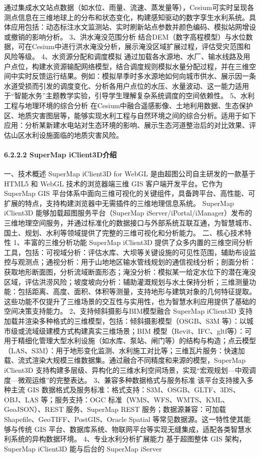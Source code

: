 通过集成水文站点数据（如水位、雨量、流速、蒸发量等），Cesium可实时呈现各测点信息在三维地球上的分布和状态变化，构建感知驱动的数字孪生水利系统。具体应用包括：动态标注水文监测站、实时刷新站点参数并颜色编码、模拟站网增设或撤销的影响分析。 3、洪水淹没范围分析 结合DEM（数字高程模型）与水位数据，可在Cesium中进行洪水淹没分析，展示淹没区域扩展过程，评估受灾范围和风险等级。 4、水资源分配和调度模拟 通过加载各水源地、水厂、输水线路及用户点位，构建水资源输配网络模型，结合调度规则模拟水量分配过程，并在三维空间中实时反馈运行结果。例如：模拟旱季时多水源地如何向城市供水、展示因一条水道受损而引发的调度变化、分析各用户点位的水压、水量波动、这一能力适用于``智能水务''主题教学实验，引导学生理解复杂系统调度的空间依赖性。 5、水利工程与地理环境的综合分析 在Cesium中融合遥感影像、土地利用数据、生态保护区、地质灾害图层等，能够实现水利工程与自然环境之间的综合分析。适用于如下应用：分析某新建水电站对生态环境的影响、展示生态河道整治后的对比效果、评估山区水利设施面临的地质灾害风险。 \paragraph{6.2.2.2 SuperMap iClient3D介绍}\label{supermap-iclient3dux4ecbux7ecd} 一、技术概述 SuperMap iClient3D for WebGL 是由超图公司自主研发的一款基于 HTML5 和 WebGL 技术的浏览器端三维 GIS 客户端开发平台。它作为 SuperMap GIS 平台体系中面向三维可视化的关键组件，具备跨平台、高性能、可扩展的特点，支持构建浏览器中无需插件的三维地理信息系统。 SuperMap iClient3D 能够加载超图服务平台（SuperMap iServer/iPortal/iManager）发布的三维地理空间服务，并通过标准化的数据接口与外部系统互联互通，为智慧城市、国土、规划、水利等领域提供了完整的三维可视化和分析能力。 二、核心技术特性 1、丰富的三维分析功能 SuperMap iClient3D 提供了众多内置的三维空间分析工具，包括：可视域分析：评估水库、大坝等关键设施的可见性范围，辅助布设监控与观测点；通视分析：用于山地地区输水管线规划的通信视线分析；剖面分析：获取地形断面图，分析流域断面形态；淹没分析：模拟某一给定水位下的潜在淹没区域，评估洪涝风险；坡度坡向分析：辅助灌溉规划与水土保持分析；三维测量功能：包括距离、高度、面积、体积等测量，支持地形与建筑对象的几何特征提取。 这些功能不仅提升了三维场景的交互性与实用性，也为智慧水利应用提供了基础的空间决策支持能力。 2、支持倾斜摄影与BIM模型融合 SuperMap iClient3D 支持加载并渲染多种格式的三维模型，包括：倾斜摄影模型（OSGB、S3M 等）：以城市级或流域级建模方式构建真实三维场景；BIM 模型（Revit、IFC、gltf等）：可用于精细化管理大型水利设施（如水库、泵站、闸门等）的结构与构造；点云模型（LAS、S3M）：用于地形变化监测、水利施工对比等；三维瓦片服务：快速加载、流式渲染大规模三维数据集。通过融合不同精度和来源的模型，SuperMap iClient3D 支持构建多层级、异构化的三维水利空间场景，实现``宏观规划---中观调度---微观运维''的完整表达。 3、兼容多种数据格式与服务标准 该平台支持接入多种主流 GIS 数据格式及服务标准：格式支持：S3M、OSGB、GLTF、3DS、OBJ、LAS 等；服务支持：OGC 标准（WMS、WFS、WMTS、KML、GeoJSON）、REST 服务、SuperMap REST 服务；数据源兼容：可加载 Shapefile、GeoTIFF、PostGIS、Oracle Spatial 等常见数据源。这一特性使其能够与传统 GIS 平台、数据库系统、物联网平台等实现无缝集成，适配各类智慧水利系统的异构数据环境。 4、专业水利分析扩展能力 基于超图整体 GIS 架构，SuperMap iClient3D 能与后台的 SuperMap iServer 
